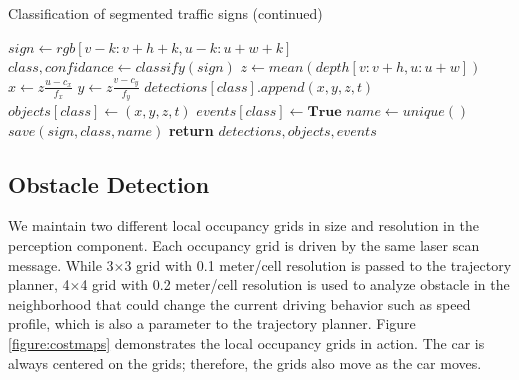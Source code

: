 \begin{algorithm}
\ContinuedFloat
\caption{Classification of segmented traffic signs (continued)}
  \begin{algorithmic}
      \State $sign \gets rgb[v-k:v+h+k, u-k:u+w+k]$
      \State $class, confidance \gets classify(sign)$
        \State $z \gets mean(depth[v:v+h, u:u+w])$
        \State $x \gets z\frac{u-c_x}{f_x}$
        \State $y \gets z\frac{v-c_y}{f_y}$
        \State $detections[class].append(x, y, z, t)$
          \State $objects[class] \gets (x, y, z, t)$
          \State $events[class] \gets \textbf{True}$
            \State $name \gets unique()$
            \State $save(sign, class, name)$
          \EndIf
        \EndIf
      \EndIf
    \EndFor
    \State \textbf{return} $detections, objects, events$
    \EndProcedure
  \end{algorithmic}
\end{algorithm}

\subsection{Obstacle Detection}

We maintain two different local occupancy grids in size and resolution in the
perception component. Each occupancy grid is driven by the same laser scan
message. While 3$\times$3 grid with 0.1 meter/cell resolution is passed to the
trajectory planner, 4$\times$4 grid with 0.2 meter/cell resolution is used to
analyze obstacle in the neighborhood that could change the current driving
behavior such as speed profile, which is also a parameter to the trajectory
planner. Figure \ref{figure:costmaps} demonstrates the local occupancy grids
in action. The car is always centered on the grids; therefore, the grids also
move as the car moves.

